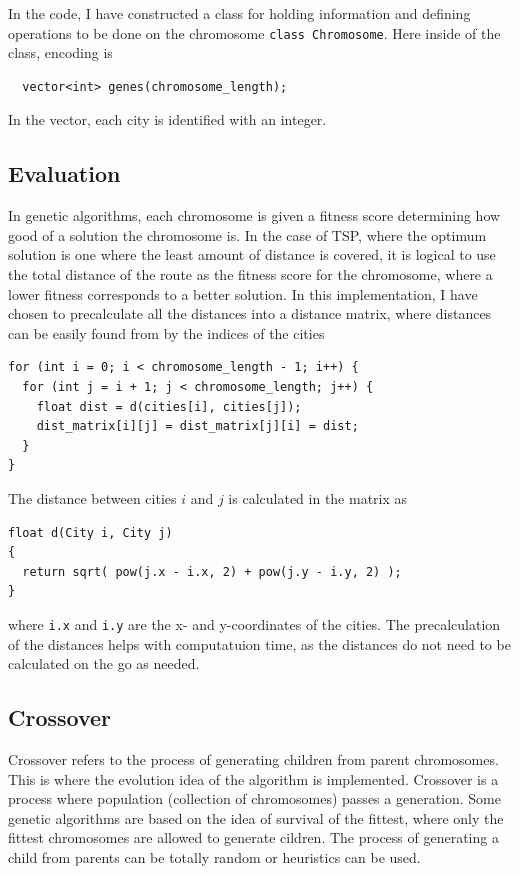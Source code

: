 \documentclass[12pt]{article}
\begin{document}
In the code, I have constructed a class for holding information and defining operations to be
done on the chromosome \lstinline?class Chromosome?. Here inside of the class, encoding is
\begin{lstlisting}
  vector<int> genes(chromosome_length);
\end{lstlisting}

In the vector, each city is identified with an integer.


\subsection{Evaluation}

In genetic algorithms, each chromosome is given a fitness score determining how good of a solution
the chromosome is. In the case of TSP, where the optimum solution is one where the least amount of
distance is covered, it is logical to use the total distance of the route as the fitness score for
the chromosome, where a lower fitness corresponds to a better solution. In this implementation, I
have chosen to precalculate all the distances into a distance matrix, where distances can be easily
found from by the indices of the cities

\begin{lstlisting}
for (int i = 0; i < chromosome_length - 1; i++) {
  for (int j = i + 1; j < chromosome_length; j++) {
    float dist = d(cities[i], cities[j]);
    dist_matrix[i][j] = dist_matrix[j][i] = dist;
  }
}
\end{lstlisting}

The distance between cities $i$ and $j$ is calculated in the matrix as
\begin{lstlisting}
float d(City i, City j)
{
  return sqrt( pow(j.x - i.x, 2) + pow(j.y - i.y, 2) );
}
\end{lstlisting}

where \lstinline!i.x! and \lstinline!i.y! are the x- and y-coordinates of the cities. The
precalculation of the distances helps with computatuion time, as the distances do not need to be
calculated on the go as needed.

\subsection{Crossover}

Crossover refers to the process of generating children from parent chromosomes. This is where the
evolution idea of the algorithm is implemented. Crossover is a process where population (collection
of chromosomes) passes a generation. Some genetic algorithms are based on the idea of survival of
the fittest, where only the fittest chromosomes are allowed to generate cildren. The process of
generating a child from parents can be totally random or heuristics can be used.
\end{document}

